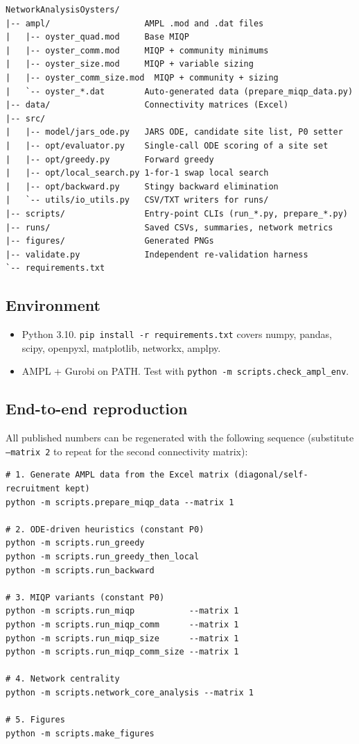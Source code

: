 \documentclass[11pt]{article}
\begin{document}
\begin{lstlisting}
NetworkAnalysisOysters/
|-- ampl/                   AMPL .mod and .dat files
|   |-- oyster_quad.mod     Base MIQP
|   |-- oyster_comm.mod     MIQP + community minimums
|   |-- oyster_size.mod     MIQP + variable sizing
|   |-- oyster_comm_size.mod  MIQP + community + sizing
|   `-- oyster_*.dat        Auto-generated data (prepare_miqp_data.py)
|-- data/                   Connectivity matrices (Excel)
|-- src/
|   |-- model/jars_ode.py   JARS ODE, candidate site list, P0 setter
|   |-- opt/evaluator.py    Single-call ODE scoring of a site set
|   |-- opt/greedy.py       Forward greedy
|   |-- opt/local_search.py 1-for-1 swap local search
|   |-- opt/backward.py     Stingy backward elimination
|   `-- utils/io_utils.py   CSV/TXT writers for runs/
|-- scripts/                Entry-point CLIs (run_*.py, prepare_*.py)
|-- runs/                   Saved CSVs, summaries, network metrics
|-- figures/                Generated PNGs
|-- validate.py             Independent re-validation harness
`-- requirements.txt
\end{lstlisting}

\subsection{Environment}

\begin{itemize}[leftmargin=1.4em, itemsep=0.1em]
  \item Python 3.10. \texttt{pip install -r requirements.txt} covers numpy, pandas, scipy, openpyxl, matplotlib, networkx, amplpy.
  \item AMPL + Gurobi on PATH. Test with \texttt{python -m scripts.check\_ampl\_env}.
\end{itemize}

\subsection{End-to-end reproduction}

All published numbers can be regenerated with the following sequence (substitute \texttt{--matrix 2} to repeat for the second connectivity matrix):

\begin{lstlisting}
# 1. Generate AMPL data from the Excel matrix (diagonal/self-recruitment kept)
python -m scripts.prepare_miqp_data --matrix 1

# 2. ODE-driven heuristics (constant P0)
python -m scripts.run_greedy
python -m scripts.run_greedy_then_local
python -m scripts.run_backward

# 3. MIQP variants (constant P0)
python -m scripts.run_miqp           --matrix 1
python -m scripts.run_miqp_comm      --matrix 1
python -m scripts.run_miqp_size      --matrix 1
python -m scripts.run_miqp_comm_size --matrix 1

# 4. Network centrality
python -m scripts.network_core_analysis --matrix 1

# 5. Figures
python -m scripts.make_figures
\end{lstlisting}
\end{document}
